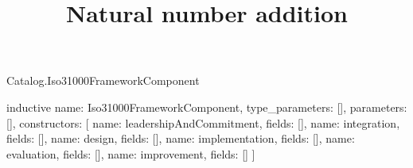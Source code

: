 \begin{lexlean}{Catalog.Iso31000FrameworkComponent}
\title{Natural number addition}
\begin{semanticmodule}
inductive{
  name: Iso31000FrameworkComponent,
  type_parameters: [],
  parameters: [],
  constructors: [
    {name: leadershipAndCommitment, fields: []},
    {name: integration, fields: []},
    {name: design, fields: []},
    {name: implementation, fields: []},
    {name: evaluation, fields: []},
    {name: improvement, fields: []}
  ]
}
\end{semanticmodule}
\end{lexlean}
